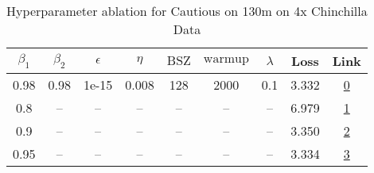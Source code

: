 \begin{table}[H]
\centering
\caption{Hyperparameter ablation for Cautious on 130m on 4x Chinchilla Data}
\label{tab:ablation_cautious_130m_4}
\begin{tabular}{ccccccccc}
\toprule
$\beta_1$ & $\beta_2$ & $\epsilon$ & $\eta$ & $\mathrm{BSZ}$ & $\mathrm{warmup}$ & $\lambda$ & Loss & Link \\
\midrule
0.98 & 0.98 & 1e-15 & 0.008 & 128 & 2000 & 0.1 & 3.332 & \href{https://wandb.ai/stanford-mercury/optimizer-scaling/runs/sweep-130m-10B-cautious3e1de9lr0.008-wd0.1-minlr0-warmup2000-b10-3b5403}{0} \\
\midrule
0.8 & -- & -- & -- & -- & -- & -- & 6.979 & \href{https://wandb.ai/stanford-mercury/optimizer-scaling/runs/sweep-130m-10B-cautious903025lr0.008-wd0.1-minlr0-warmup2000-b10-75de62}{1} \\
0.9 & -- & -- & -- & -- & -- & -- & 3.350 & \href{https://wandb.ai/stanford-mercury/optimizer-scaling/runs/sweep-130m-10B-cautiousdb200alr0.008-wd0.1-minlr0-warmup2000-b10-103ef8}{2} \\
0.95 & -- & -- & -- & -- & -- & -- & 3.334 & \href{https://wandb.ai/stanford-mercury/optimizer-scaling/runs/sweep-130m-10B-cautious1b41e3lr0.008-wd0.1-minlr0-warmup2000-b10-903f34}{3} \\
\bottomrule
\end{tabular}
\end{table}

